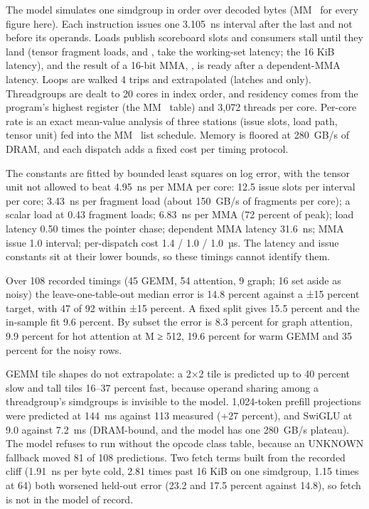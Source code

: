 The model simulates one simdgroup in order over decoded bytes (MM~ for every figure here). Each
instruction issues one 3.105~ns interval after the last and not before its operands. Loads publish scoreboard slots
and consumers stall until they land (tensor fragment loads,  and , take the working-set latency;
 the 16 KiB latency), and the result of a 16-bit MMA, , is ready after a dependent-MMA latency.
Loops are walked 4 trips and extrapolated (latches  and  only). Threadgroups are dealt
to 20 cores in index order, and residency comes from the program's highest register (the MM~ table) and
3,072 threads per core. Per-core rate is an exact mean-value analysis of three stations (issue slots, load path,
tensor unit) fed into the MM~ list schedule. Memory is floored at 280~GB/s of DRAM, and each dispatch
adds a fixed cost per timing protocol.

The constants are fitted by bounded least squares on log error, with the tensor unit not allowed to beat 4.95~ns per
MMA per core: 12.5 issue slots per interval per core; 3.43~ns per fragment load (about 150~GB/s of fragments per
core); a scalar load at 0.43 fragment loads; 6.83~ns per MMA (72 percent of peak); load latency 0.50 times the
pointer chase; dependent MMA latency 31.6~ns; MMA issue
1.0 interval; per-dispatch cost 1.4 / 1.0 / 1.0~µs. The latency and issue constants sit at their lower bounds, so
these timings cannot identify them.

Over 108 recorded timings (45 GEMM, 54 attention, 9 graph; 16 set aside as noisy) the leave-one-table-out median error
is 14.8 percent against a ±15 percent target, with 47 of 92 within ±15 percent. A fixed split gives 15.5 percent and
the in-sample fit 9.6 percent. By subset the error is 8.3 percent for graph attention, 9.9 percent for hot attention
at M ≥ 512, 19.6 percent for warm GEMM and 35 percent for the noisy rows.

GEMM tile shapes do not extrapolate: a 2×2 tile is predicted up to 40 percent slow and tall tiles 16–37 percent fast,
because operand sharing among a threadgroup's simdgroups is invisible to the model. 1,024-token prefill projections
were predicted at 144~ms against 113 measured (+27 percent), and SwiGLU at 9.0 against 7.2~ms (DRAM-bound, and the
model has one 280~GB/s plateau). The model refuses to run without the
opcode class table, because an UNKNOWN fallback moved 81 of 108 predictions. Two fetch terms built from the recorded
cliff (1.91~ns per byte cold, 2.81 times past 16 KiB on one simdgroup, 1.15 times at 64) both worsened held-out error
(23.2 and 17.5 percent against 14.8), so fetch is not in the model of record.

